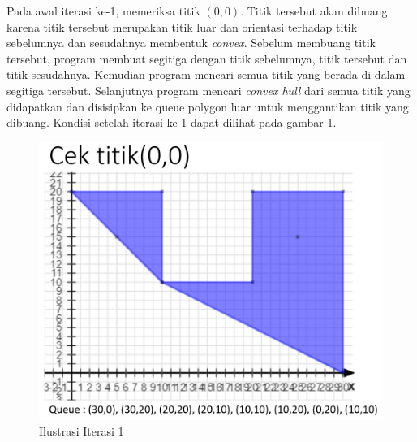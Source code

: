 \par Pada awal iterasi ke-1, memeriksa titik $(0,0)$. Titik tersebut akan dibuang karena titik tersebut merupakan titik luar dan orientasi terhadap titik sebelumnya dan sesudahnya membentuk \textit{convex}. Sebelum membuang titik tersebut, program membuat segitiga dengan titik sebelumnya, titik tersebut dan titik sesudahnya. Kemudian program mencari semua titik yang berada di dalam segitiga tersebut. Selanjutnya program mencari \textit{convex hull} dari semua titik yang didapatkan dan disisipkan ke queue polygon luar untuk menggantikan titik yang dibuang. Kondisi setelah iterasi ke-1 dapat dilihat pada gambar \ref{fig:iterasi-1}.
\begin{figure}[!h]
	\Centering
	\includegraphics [width=\columnwidth]{bab5/img/iterasi-1}
	\caption {Ilustrasi Iterasi 1}
	\label {fig:iterasi-1}
\end{figure}

